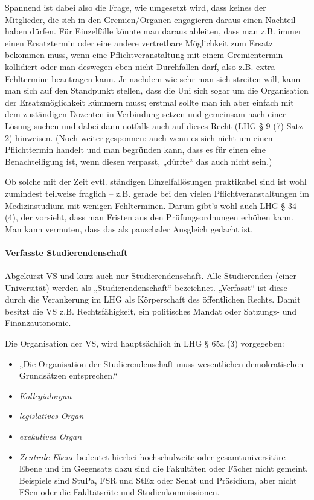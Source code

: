 \documentclass[
10pt,
a4paper,
twoside,								%
titlepage=false,							%
draft=false								%
]{scrartcl}
\begin{document}
Spannend ist dabei also die Frage, wie umgesetzt wird, dass keines der Mitglieder, die sich in den Gremien/Organen engagieren daraus einen Nachteil haben dürfen. Für Einzelfälle könnte man daraus ableiten, dass man z.B. immer einen Ersatztermin oder eine andere vertretbare Möglichkeit zum Ersatz bekommen muss, wenn eine Pflichtveranstaltung mit einem Gremientermin kollidiert oder man deswegen eben nicht Durchfallen darf, also z.B. extra Fehltermine beantragen kann. Je nachdem wie sehr man sich streiten will, kann man sich auf den Standpunkt stellen, dass die Uni sich sogar um die Organisation der Ersatzmöglichkeit kümmern muss; erstmal sollte man ich aber einfach mit dem zuständigen Dozenten in Verbindung setzen und gemeinsam nach einer Lösung suchen und dabei dann notfalls auch auf dieses Recht (LHG § 9 (7) Satz 2) hinweisen. (Noch weiter gesponnen: auch wenn es sich nicht um einen Pflichttermin handelt und man begründen kann, dass es für einen eine Benachteiligung ist, wenn diesen verpasst, „dürfte“ das auch nicht sein.)

Ob solche mit der Zeit evtl. ständigen Einzelfallösungen praktikabel sind ist wohl zumindest teilweise fraglich – z.B. gerade bei den vielen Pflichtveranstaltungen im Medizinstudium mit wenigen Fehlterminen. Darum gibt's wohl auch LHG § 34 (4), der vorsieht, dass man Fristen aus den Prüfungsordnungen erhöhen kann. Man kann vermuten, dass das als pauschaler Ausgleich gedacht ist.


\paragraph{Verfasste Studierendenschaft}

Abgekürzt VS und kurz auch nur Studierendenschaft. Alle Studierenden (einer Universität) werden als „Studierendenschaft“ bezeichnet. „Verfasst“ ist diese durch die Verankerung im LHG als Körperschaft des öffentlichen Rechts. Damit besitzt die VS z.B. Rechtsfähigkeit, ein politisches Mandat oder Satzungs- und Finanzautonomie.

Die Organisation der VS, wird hauptsächlich in LHG § 65a (3) vorgegeben:
\begin{itemize}
	\item „Die Organisation der Studierendenschaft muss wesentlichen demokratischen Grundsätzen entsprechen.“
	\item \emph{Kollegialorgan}
	\item \emph{legislatives Organ}
	\item \emph{exekutives Organ}
	\item \emph{Zentrale Ebene} bedeutet hierbei hochschulweite oder gesamtuniversitäre Ebene und im Gegensatz dazu sind die Fakultäten oder Fächer nicht gemeint. Beispiele sind StuPa, FSR und StEx oder Senat und Präsidium, aber nicht FSen oder die Fakltätsräte und Studienkommissionen.
\end{itemize}
\end{document}
